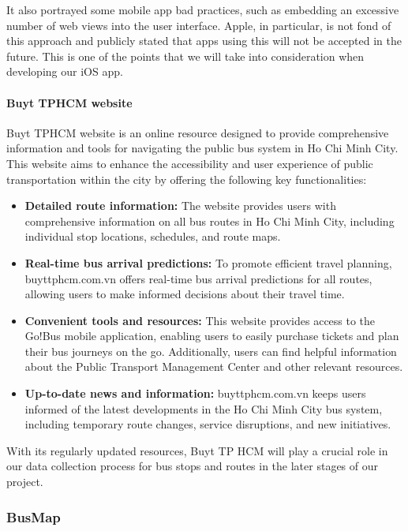 It also portrayed some mobile app bad practices, such as embedding an excessive number of web views into the user interface. Apple, in particular, is not fond of this approach and publicly stated that apps using this will not be accepted in the future. This is one of the points that we will take into consideration when developing our iOS app.

\paragraph{Buyt TPHCM website}
Buyt TPHCM website is an online resource designed to provide comprehensive information and tools for navigating the public bus system in Ho Chi Minh City. This website aims to enhance the accessibility and user experience of public transportation within the city by offering the following key functionalities:

\begin{itemize}
    \item \textbf{Detailed route information:} The website provides users with comprehensive information on all bus routes in Ho Chi Minh City, including individual stop locations, schedules, and route maps.
    \item \textbf{Real-time bus arrival predictions:} To promote efficient travel planning, buyttphcm.com.vn offers real-time bus arrival predictions for all routes, allowing users to make informed decisions about their travel time.
    \item \textbf{Convenient tools and resources:} This website provides access to the Go!Bus mobile application, enabling users to easily purchase tickets and plan their bus journeys on the go. Additionally, users can find helpful information about the Public Transport Management Center and other relevant resources.
    \item \textbf{Up-to-date news and information:} buyttphcm.com.vn keeps users informed of the latest developments in the Ho Chi Minh City bus system, including temporary route changes, service disruptions, and new initiatives.
\end{itemize}

With its regularly updated resources, Buyt TP HCM will play a crucial role in our data collection process for bus stops and routes in the later stages of our project.

\subsubsection{BusMap}

